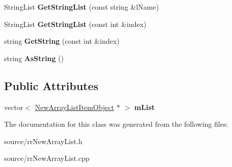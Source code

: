 \begin{DoxyCompactItemize}
\item 
\hypertarget{classrr_1_1_new_array_list_a7fb9889da54b61b3ccf8bdfecb4d4ad3}{String\-List {\bfseries Get\-String\-List} (const string \&l\-Name)}\label{classrr_1_1_new_array_list_a7fb9889da54b61b3ccf8bdfecb4d4ad3}

\item 
\hypertarget{classrr_1_1_new_array_list_a03a1a978863bcabb1c9683445efc35c9}{String\-List {\bfseries Get\-String\-List} (const int \&index)}\label{classrr_1_1_new_array_list_a03a1a978863bcabb1c9683445efc35c9}

\item 
\hypertarget{classrr_1_1_new_array_list_a73f59df3ce40a16a7f03135eb105fb0e}{string {\bfseries Get\-String} (const int \&index)}\label{classrr_1_1_new_array_list_a73f59df3ce40a16a7f03135eb105fb0e}

\item 
\hypertarget{classrr_1_1_new_array_list_a4850a79adc8a0c86cf22cc499c8c35cb}{string {\bfseries As\-String} ()}\label{classrr_1_1_new_array_list_a4850a79adc8a0c86cf22cc499c8c35cb}

\end{DoxyCompactItemize}
\subsection*{Public Attributes}
\begin{DoxyCompactItemize}
\item 
\hypertarget{classrr_1_1_new_array_list_a2e9c81cb5fc53fe08c8c53d57bc105bf}{vector$<$ \hyperlink{classrr_1_1_new_array_list_item_object}{New\-Array\-List\-Item\-Object} $\ast$ $>$ {\bfseries m\-List}}\label{classrr_1_1_new_array_list_a2e9c81cb5fc53fe08c8c53d57bc105bf}

\end{DoxyCompactItemize}


The documentation for this class was generated from the following files\-:\begin{DoxyCompactItemize}
\item 
source/rr\-New\-Array\-List.\-h\item 
source/rr\-New\-Array\-List.\-cpp\end{DoxyCompactItemize}
